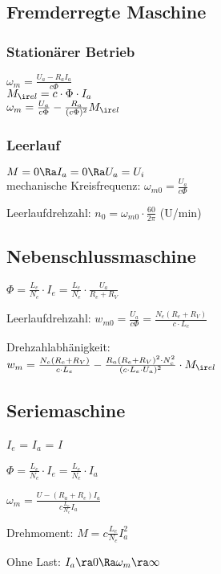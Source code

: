 \documentclass[fs, german]{latex4ei_fs}
\begin{document}
\begin{sectionbox}
\subsection{Fremderregte Maschine}

\subsubsection*{Stationärer Betrieb}
$\omega_m =  \frac{U_a - R_a I_a}{c \Phi} $ \\
$M_{\ir el} = c \cdot \Phi \cdot I_a$ \\

$\omega_m = \frac{U_a}{c \Phi} - \frac{R_a}{(c \Phi)^2} M_{\ir el}  $
\subsubsection*{Leerlauf}
 $M = 0 \Ra I_a = 0 \Ra U_a = U_i$ \\
 mechanische Kreisfrequenz: $\omega_{m0} = \frac{U_a}{c \Phi}$

 Leerlaufdrehzahl: $n_0 = \omega_{m0} \cdot \frac{60}{2 \pi}$ (U/min)
\end{sectionbox}
\begin{sectionbox}
\subsection{Nebenschlussmaschine}

$\Phi = \frac{L_e}{N_e} \cdot I_e = \frac{L_e}{N_e} \cdot \frac{U_a}{R_e + R_V}$

Leerlaufdrehzahl: $w_{m0} = \frac{U_a}{c \Phi} = \frac{N_e (R_e + R_V)}{c \cdot L_e}$

Drehzahlabhänigkeit:\\ $w_m = \frac{N_e (R_e + R_V)}{c \cdot L_e} - \frac{R_a (R_e + R_V)^2 \cdot N_e^2}{(c \cdot L_e \cdot U_a)^2} \cdot M_{\ir el}$
\end{sectionbox}
\begin{sectionbox}
\subsection{Seriemaschine}

$I_e$ = $I_a$ = $I$

$\Phi = \frac{L_e}{N_e} \cdot I_e = \frac{L_e}{N_e} \cdot I_a$

$\omega_m = \frac{U- (R_a + R_e) I_a}{c \frac{L_e}{N_e} I_a}$

Drehmoment: $M = c \frac{L_e}{N_e} I_a^2 $

Ohne Last: $I_a \ra 0 \Ra \omega_m \ra \infty$
\end{sectionbox}
\end{document}
